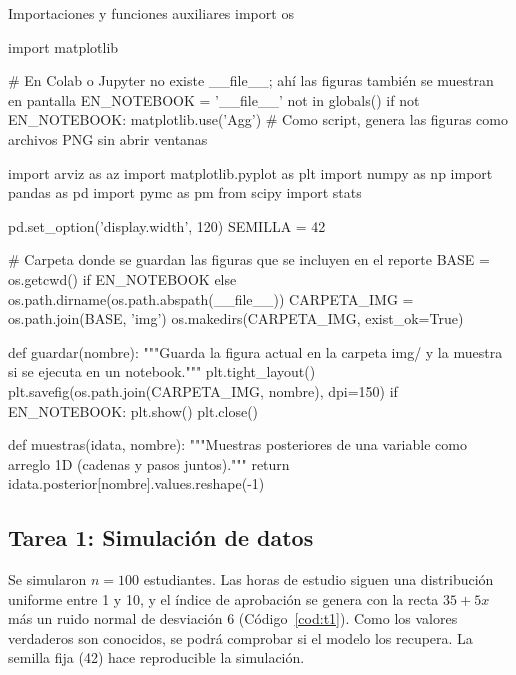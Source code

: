 \documentclass[11pt,letterpaper]{article}
\begin{document}
\begin{codigo}[label=cod:comun]{Importaciones y funciones auxiliares}
import os

import matplotlib

# En Colab o Jupyter no existe __file__; ahí las figuras también se muestran en pantalla
EN_NOTEBOOK = '__file__' not in globals()
if not EN_NOTEBOOK:
    matplotlib.use('Agg')  # Como script, genera las figuras como archivos PNG sin abrir ventanas

import arviz as az
import matplotlib.pyplot as plt
import numpy as np
import pandas as pd
import pymc as pm
from scipy import stats

pd.set_option('display.width', 120)
SEMILLA = 42

# Carpeta donde se guardan las figuras que se incluyen en el reporte
BASE = os.getcwd() if EN_NOTEBOOK else os.path.dirname(os.path.abspath(__file__))
CARPETA_IMG = os.path.join(BASE, 'img')
os.makedirs(CARPETA_IMG, exist_ok=True)


def guardar(nombre):
    """Guarda la figura actual en la carpeta img/ y la muestra si se ejecuta en un notebook."""
    plt.tight_layout()
    plt.savefig(os.path.join(CARPETA_IMG, nombre), dpi=150)
    if EN_NOTEBOOK:
        plt.show()
    plt.close()


def muestras(idata, nombre):
    """Muestras posteriores de una variable como arreglo 1D (cadenas y pasos juntos)."""
    return idata.posterior[nombre].values.reshape(-1)
\end{codigo}

\subsection{Tarea 1: Simulación de datos}

Se simularon $n = 100$ estudiantes. Las horas de estudio siguen una distribución uniforme entre 1 y 10, y el índice de aprobación se genera con la recta $35 + 5x$ más un ruido normal de desviación 6 (Código~\ref{cod:t1}). Como los valores verdaderos son conocidos, se podrá comprobar si el modelo los recupera. La semilla fija (42) hace reproducible la simulación.
\end{document}
